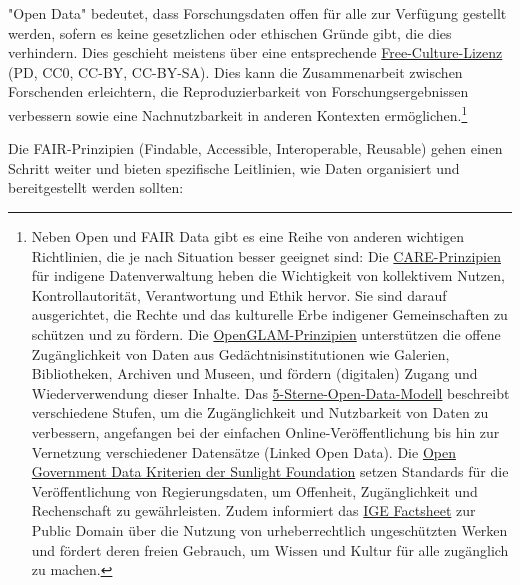 \documentclass[
  letterpaper,
  DIV=11,
  numbers=noendperiod]{scrartcl}
\begin{document}
"Open Data" bedeutet, dass Forschungsdaten offen für alle zur Verfügung
gestellt werden, sofern es keine gesetzlichen oder ethischen Gründe
gibt, die dies verhindern. Dies geschieht meistens über eine
entsprechende
\href{https://creativecommons.org/share-your-work/public-domain/freeworks/}{Free-Culture-Lizenz}
(PD, CC0, CC-BY, CC-BY-SA). Dies kann die Zusammenarbeit zwischen
Forschenden erleichtern, die Reproduzierbarkeit von
Forschungsergebnissen verbessern sowie eine Nachnutzbarkeit in anderen
Kontexten ermöglichen.\footnote{Neben Open und FAIR Data gibt es eine
  Reihe von anderen wichtigen Richtlinien, die je nach Situation besser
  geeignet sind: Die
  \href{https://www.gida-global.org/care}{CARE-Prinzipien} für indigene
  Datenverwaltung heben die Wichtigkeit von kollektivem Nutzen,
  Kontrollautorität, Verantwortung und Ethik hervor. Sie sind darauf
  ausgerichtet, die Rechte und das kulturelle Erbe indigener
  Gemeinschaften zu schützen und zu fördern. Die
  \href{https://openglam.org/principles/}{OpenGLAM-Prinzipien}
  unterstützen die offene Zugänglichkeit von Daten aus
  Gedächtnisinstitutionen wie Galerien, Bibliotheken, Archiven und
  Museen, und fördern (digitalen) Zugang und Wiederverwendung dieser
  Inhalte. Das
  \href{https://5stardata.info/de/}{5-Sterne-Open-Data-Modell}
  beschreibt verschiedene Stufen, um die Zugänglichkeit und Nutzbarkeit
  von Daten zu verbessern, angefangen bei der einfachen
  Online-Veröffentlichung bis hin zur Vernetzung verschiedener
  Datensätze (Linked Open Data). Die
  \href{https://sunlightfoundation.com/opendataguidelines/}{Open
  Government Data Kriterien der Sunlight Foundation} setzen Standards
  für die Veröffentlichung von Regierungsdaten, um Offenheit,
  Zugänglichkeit und Rechenschaft zu gewährleisten. Zudem informiert das
  \href{https://www.ige.ch/en/protecting-your-ip/copyright/using-a-work/public-domain}{IGE
  Factsheet} zur Public Domain über die Nutzung von urheberrechtlich
  ungeschützten Werken und fördert deren freien Gebrauch, um Wissen und
  Kultur für alle zugänglich zu machen.}

Die FAIR-Prinzipien (Findable, Accessible, Interoperable, Reusable)
gehen einen Schritt weiter und bieten spezifische Leitlinien, wie Daten
organisiert und bereitgestellt werden sollten:
\end{document}
